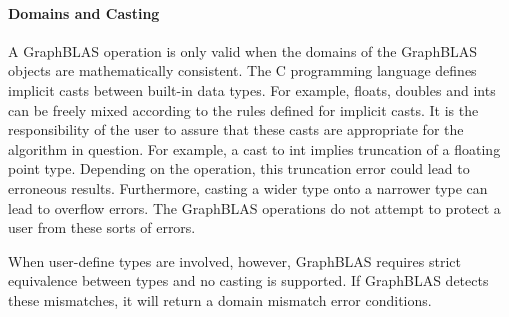 \paragraph{Domains and Casting}

A GraphBLAS operation is only valid when the domains of the GraphBLAS objects are
mathematically consistent.  The C programming language defines implicit casts 
between built-in data types.  For example, {\sf float}s, {\sf double}s and {\sf int}s can be 
freely mixed according to the rules defined for implicit casts.  It is the 
responsibility of the user to assure that these casts are appropriate for the 
algorithm in question.  For example, a cast to {\sf int} implies truncation of a floating 
point type.  Depending on the operation, this truncation error could lead to
erroneous results.  Furthermore, casting a wider type onto a narrower type can lead 
to overflow errors.  The GraphBLAS operations do not attempt to protect a user from 
these sorts of errors.

When user-define types are involved, however, GraphBLAS requires strict equivalence
between types and no casting is supported.  If GraphBLAS detects these mismatches,
it will return a domain mismatch error conditions.


